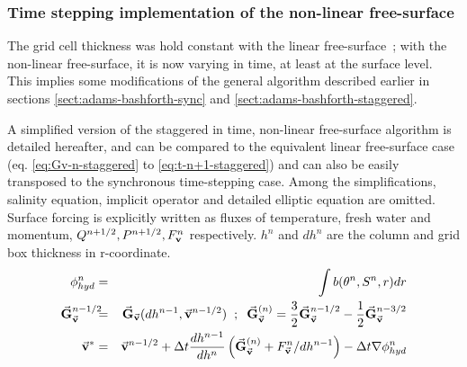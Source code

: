 \subsubsection{Time stepping implementation of the
non-linear free-surface}     
\label{sect:nonlin-freesurf-timestepping}

The grid cell thickness was hold constant with the linear
free-surface~; with the non-linear free-surface, it is now varying 
in time, at least at the surface level.
This implies some modifications of the general algorithm described 
earlier in sections \ref{sect:adams-bashforth-sync} and 
\ref{sect:adams-bashforth-staggered}.

A simplified version of the staggered in time, non-linear 
free-surface algorithm is detailed hereafter, and can be compared 
to the equivalent linear free-surface case (eq. \ref{eq:Gv-n-staggered}
to \ref{eq:t-n+1-staggered}) and can also be easily transposed
to the synchronous time-stepping case.
Among the simplifications, salinity equation, implicit operator
and detailed elliptic equation are omitted. Surface forcing is
explicitly written as fluxes of temperature, fresh water and
momentum, $Q^{n+1/2}, P^{n+1/2}, F_{\bf v}^n$ respectively.
$h^n$ and $dh^n$ are the column and grid box thickness in r-coordinate.
\begin{eqnarray}
\phi^{n}_{hyd} & = & \int b(\theta^{n},S^{n},r) dr
\label{eq:phi-hyd-nlfs} \\
\vec{\bf G}_{\vec{\bf v}}^{n-1/2}\hspace{-2mm} & = & 
\vec{\bf G}_{\vec{\bf v}} (dh^{n-1},\vec{\bf v}^{n-1/2})
\hspace{+2mm};\hspace{+2mm}
\vec{\bf G}_{\vec{\bf v}}^{(n)} =  
   \frac{3}{2} \vec{\bf G}_{\vec{\bf v}}^{n-1/2} 
-  \frac{1}{2} \vec{\bf G}_{\vec{\bf v}}^{n-3/2}
\label{eq:Gv-n-nlfs} \\
\vec{\bf v}^{*} & = & \vec{\bf v}^{n-1/2} + \Delta t \frac{dh^{n-1}}{dh^{n}} \left(
\vec{\bf G}_{\vec{\bf v}}^{(n)} + F_{\vec{\bf v}}^{n}/dh^{n-1} \right)
- \Delta t \nabla \phi_{hyd}^{n}
\label{eq:vstar-nlfs}
\end{eqnarray}
